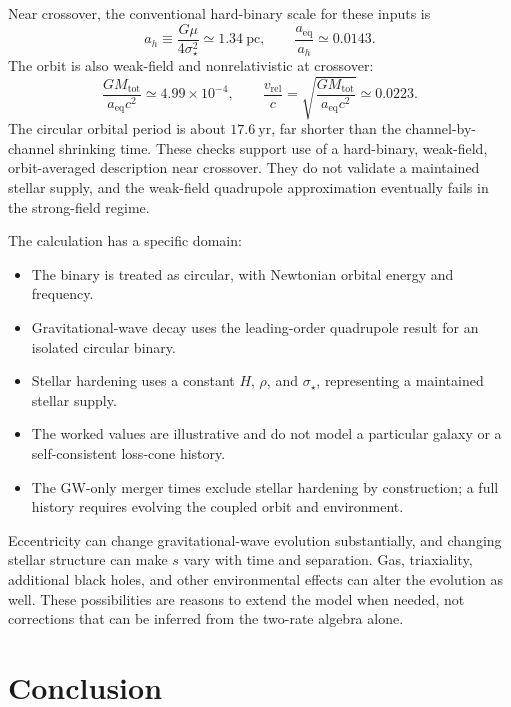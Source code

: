 \documentclass[12pt]{article}
\begin{document}
Near crossover, the conventional hard-binary scale for these inputs is
\begin{equation}
  a_h\equiv\frac{G\mu}{4\sigma_\star^2}
  \simeq1.34\ \mathrm{pc},
  \qquad
  \frac{a_{\mathrm{eq}}}{a_h}\simeq0.0143.
  \label{eq:hard-binary-scale}
\end{equation}
The orbit is also weak-field and nonrelativistic at crossover:
\begin{equation}
  \frac{GM_{\mathrm{tot}}}{a_{\mathrm{eq}}c^2}\simeq4.99\times10^{-4},
  \qquad
  \frac{v_{\mathrm{rel}}}{c}
  =\sqrt{\frac{GM_{\mathrm{tot}}}{a_{\mathrm{eq}}c^2}}
  \simeq0.0223.
  \label{eq:crossover-regime}
\end{equation}
The circular orbital period is about $17.6\ \mathrm{yr}$, far shorter than the channel-by-channel shrinking time. These checks support use of a hard-binary, weak-field, orbit-averaged description near crossover. They do not validate a maintained stellar supply, and the weak-field quadrupole approximation eventually fails in the strong-field regime.

The calculation has a specific domain:
\begin{itemize}
  \item The binary is treated as circular, with Newtonian orbital energy and frequency.
  \item Gravitational-wave decay uses the leading-order quadrupole result for an isolated circular binary.
  \item Stellar hardening uses a constant $H$, $\rho$, and $\sigma_\star$, representing a maintained stellar supply.
  \item The worked values are illustrative and do not model a particular galaxy or a self-consistent loss-cone history.
  \item The GW-only merger times exclude stellar hardening by construction; a full history requires evolving the coupled orbit and environment.
\end{itemize}

Eccentricity can change gravitational-wave evolution substantially, and changing stellar structure can make $s$ vary with time and separation. Gas, triaxiality, additional black holes, and other environmental effects can alter the evolution as well. These possibilities are reasons to extend the model when needed, not corrections that can be inferred from the two-rate algebra alone.

\section{Conclusion}
\end{document}
